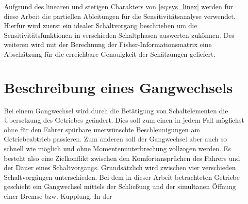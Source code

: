 Aufgrund des linearen und stetigen Charakters von \eqref{eq:sys_linex} werden für diese Arbeit die partiellen Ableitungen für die Sensitivitätsanalyse verwendet.
Hierfür wird zuerst ein idealer Schaltvorgang beschrieben um die Sensitivitätsfunktionen in verschieden Schaltphasen auswerten zukönnen. Des weiteren wird mit der Berechnung der Fisher-Informationsmatrix eine Abschätzung für die erreichbare Genauigkeit der Schätzungen geliefert.
   
\section{Beschreibung eines Gangwechsels}\label{sec:Gangwechsel}
Bei einem Gangwechsel wird durch die Betätigung von Schaltelementen die Übersetzung des Getriebes geändert. Dies soll zum einen in jedem Fall möglichst ohne für den Fahrer spürbare unerwünschte Beschleunigungen am Getriebeabtrieb passieren. Zum anderen soll der Gangwechsel aber auch so schnell wie möglich und ohne Momentenunterbrechung vollzogen werden. Es besteht also eine Zielkonflikt zwischen den Komfortansprüchen des Fahrers und der Dauer eines Schaltvorgangs. Grundsätzlich wird zwischen vier verschieden Schaltvorgängen unterschieden. 
Bei dem in dieser Arbeit betrachteten Getriebe geschieht ein Gangwechsel mittels der Schließung und der simultanen Öffnung einer Bremse bzw. Kupplung. In der   


